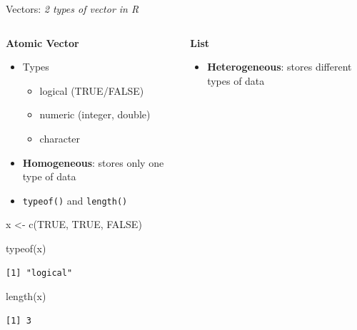 \documentclass[
  ignorenonframetext,
]{beamer}
\newenvironment{Shaded}{\begin{snugshade}}{\end{snugshade}}
\newcommand{\ConstantTok}[1]{\textcolor[rgb]{0.56,0.35,0.01}{#1}}
\newcommand{\FunctionTok}[1]{\textcolor[rgb]{0.28,0.35,0.67}{#1}}
\newcommand{\NormalTok}[1]{\textcolor[rgb]{0.00,0.23,0.31}{#1}}
\newcommand{\OtherTok}[1]{\textcolor[rgb]{0.00,0.23,0.31}{#1}}
\providecommand{\tightlist}{%
  \setlength{\itemsep}{0pt}\setlength{\parskip}{0pt}}\usepackage{longtable,booktabs,array}
\begin{document}
\begin{frame}[fragile]{Vectors: \emph{2 types of vector in R}}
\protect\hypertarget{vectors-2-types-of-vector-in-r}{}
\begin{columns}[c,totalwidth=8em]
\begin{column}{0.5\textwidth}
\textbf{Atomic Vector}

\begin{itemize}
\tightlist
\item
  Types

  \begin{itemize}
  \tightlist
  \item
    logical (TRUE/FALSE)
  \item
    numeric (integer, double)
  \item
    character
  \end{itemize}
\item
  \textbf{Homogeneous}: stores only one type of data
\item
  \texttt{typeof()} and \texttt{length()}
\end{itemize}

\begin{Shaded}
\begin{Highlighting}[]
\NormalTok{x }\OtherTok{\textless{}{-}} \FunctionTok{c}\NormalTok{(}\ConstantTok{TRUE}\NormalTok{, }\ConstantTok{TRUE}\NormalTok{, }\ConstantTok{FALSE}\NormalTok{)}

\FunctionTok{typeof}\NormalTok{(x)}
\end{Highlighting}
\end{Shaded}

\begin{verbatim}
[1] "logical"
\end{verbatim}

\begin{Shaded}
\begin{Highlighting}[]
\FunctionTok{length}\NormalTok{(x)}
\end{Highlighting}
\end{Shaded}

\begin{verbatim}
[1] 3
\end{verbatim}
\end{column}

\begin{column}{0.5\textwidth}
\textbf{List}

\begin{itemize}
\tightlist
\item
  \textbf{Heterogeneous}: stores different types of data
\end{itemize}


\end{column}
\end{columns}
\end{frame}
\end{document}
